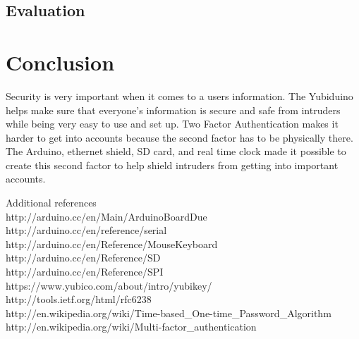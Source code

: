 \documentclass[conference]{IEEEtran}
\begin{document}
\subsection{Evaluation}


\section{Conclusion}
Security is very important when it comes to a users information. The Yubiduino
helps make sure that everyone's information is secure and safe from intruders
while being very easy to use and set up.  Two Factor Authentication makes it
harder to get into accounts because the second factor has to be physically
there.  The Arduino, ethernet shield, SD card, and real time clock made it
possible to create this second factor to help shield intruders from getting
into important accounts.

Additional references \\
http://arduino.cc/en/Main/ArduinoBoardDue \\
http://arduino.cc/en/reference/serial \\
http://arduino.cc/en/Reference/MouseKeyboard \\
http://arduino.cc/en/Reference/SD \\
http://arduino.cc/en/Reference/SPI \\
https://www.yubico.com/about/intro/yubikey/ \\
http://tools.ietf.org/html/rfc6238 \\
http://en.wikipedia.org/wiki/Time-based\_One-time\_Password\_Algorithm \\
http://en.wikipedia.org/wiki/Multi-factor\_authentication \\




\end{document}
